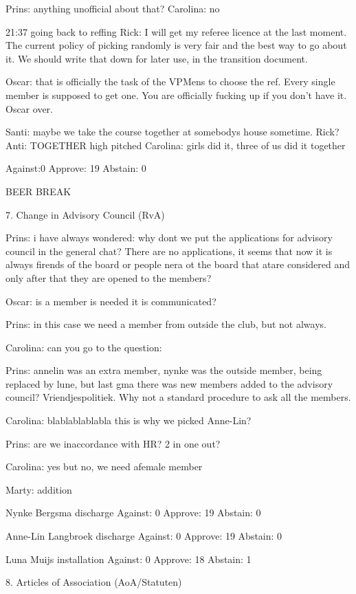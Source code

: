 \documentclass[12pt, a4paper]{article}
\begin{document}
Prins: anything unofficial about that?
Carolina: no

21:37 going back to reffing
Rick: I will get my referee licence at the last moment. The current policy of picking randomly is very fair and the best way to go about it.  We should write that down for later use, in the transition document. 

Oscar: that is officially the task of the VPMens to choose the ref. Every single member is supposed to get one. You are officially fucking up if you don’t have it. Oscar over.

Santi: maybe we take the course together at somebodys house sometime.
Rick?
Anti: TOGETHER high pitched
Carolina: girls did it, three of us did it together

Against:0
Approve: 19
Abstain: 0

BEER BREAK

7. Change in Advisory Council (RvA)



Prins: i have always wondered: why dont we put the applications for advisory council in the general chat? There are no applications, it seems that now it is always firends of the board or people nera ot the board that atare considered and only after that they are opened to the members?

Oscar: is a member is needed it is communicated?

Prins: in this case we need a member from outside the club, but not always. 

Carolina: can you go to the question:

Prins: annelin was an extra member, nynke was the outside member, being replaced by lune, but last gma there was new members added to the advisory council? Vriendjespolitiek. Why not a standard procedure to ask all the members.

Carolina: blablablablabla this is why we picked Anne-Lin? 

Prins: are we inaccordance with HR? 2 in one out?

Carolina: yes but no, we need afemale member

Marty: addition

Nynke Bergsma discharge
Against: 0
Approve: 19
Abstain: 0

Anne-Lin Langbroek discharge
Against: 0
Approve: 19
Abstain: 0

Luna Muijs installation
Against: 0
Approve: 18
Abstain: 1

8. Articles of Association (AoA/Statuten)
\end{document}
